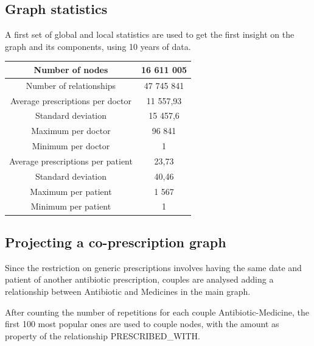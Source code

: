 \subsection{Graph statistics}
A first set of global and local statistics are used to get the first insight on the graph and its components, using 10 years of data.

\begin{center}
	\begin{tabular}{c|c}
		Number of nodes & 16 611 005 \\
		\hline
		Number of relationships & 47 745 841 \\
		\hline
		Average prescriptions per doctor & 11 557,93 \\
		\hline
		Standard deviation & 15 457,6 \\
		\hline
		Maximum per doctor & 96 841 \\
		\hline
		Minimum per doctor & 1 \\
		\hline
		Average prescriptions per patient & 23,73 \\
		\hline
		Standard deviation & 40,46 \\
		\hline
		Maximum per patient & 1 567 \\
		\hline
		Minimum per patient & 1
	\end{tabular}
\end{center}

\subsection{Projecting a co-prescription graph}
Since the restriction on generic prescriptions involves having the same date and patient of another antibiotic prescription, couples are analysed adding a relationship between Antibiotic and Medicines in the main graph.

After counting the number of repetitions for each couple Antibiotic-Medicine, the first 100 most popular ones are used to couple nodes, with the amount as property of the relationship PRESCRIBED\_WITH.

